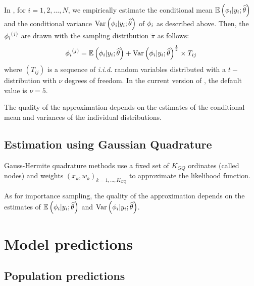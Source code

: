 In \saemix, for $i=1,2,\ldots, N$, we empirically estimate the conditional mean $\mathbb{E}\left({{\phi}_i}|y_{i};{\widehat{\theta}}\right)$ and the conditional variance $\mbox{Var}\left({{\phi}_i}|y_{i};{\widehat{\theta}}\right)$ of ${{\phi}_i}$ as described above. Then, the ${{\phi}_i}^{(j)}$ are drawn with the sampling distribution $\tilde{\pi}$ as follows:
$${{\phi}_i}^{(j)} = \mathbb{E}\left({{\phi}_i}|y_{i};{\widehat{\theta}}\right) + \mbox{Var}\left({{\phi}_i}|y_{i};{\widehat{\theta}}\right)^{\frac{1}{2}} \times T_{ij}$$
where $(T_{ij})$ is a sequence of {\it i.i.d.} random variables distributed with a $t-$distribution with $\nu$ degrees of freedom. In the current version of \saemix, the default value is $\nu=5$. 


The quality of the approximation depends on the estimates of the conditional mean and variances of the individual distributions.

\subsection{Estimation using Gaussian Quadrature} \label{sec:gqlike}


Gauss-Hermite quadrature methods use a fixed set of $K_{GQ}$ ordinates (called nodes) and weights $(x_k, w_k)_{k=1,...,K_{GQ}}$ to approximate the likelihood function.

As for importance sampling, the quality of the approximation depends on the estimates of $\mathbb{E}\left({{\phi}_i}|y_{i};{\widehat{\theta}}\right)$ and $\mbox{Var}\left({{\phi}_i}|y_{i};{\widehat{\theta}}\right)$.


\section{Model predictions} \label{section_preds}

\subsection{Population predictions}

